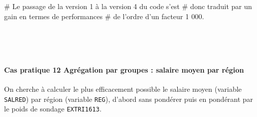 \documentclass[12pt,]{article}
\newenvironment{Shaded}{}{}
\newcommand{\CommentTok}[1]{\textcolor[rgb]{0.00,0.50,0.00}{{#1}}}
\let\oldparagraph\paragraph
\renewcommand{\paragraph}[1]{\oldparagraph{#1}\mbox{}}
\begin{document}
\begin{enumerate}
\begin{Shaded}
\begin{Highlighting}[]
\CommentTok{# Le passage de la version 1 à la version 4 du code s'est}
\CommentTok{# donc traduit par un gain en termes de performances}
\CommentTok{# de l'ordre d'un facteur 1 000.}
\end{Highlighting}
\end{Shaded}

  ~
\end{enumerate}

~

\paragraph{\texorpdfstring{\textbf{Cas pratique 12} Agrégation par
groupes : salaire moyen par
région}{Cas pratique 12 Agrégation par groupes : salaire moyen par région}}\label{cas-pratique-12-agregation-par-groupes-salaire-moyen-par-region}

On cherche à calculer le plus efficacement possible le salaire moyen
(variable \texttt{SALRED}) par région (variable \texttt{REG}), d'abord
sans pondérer puis en pondérant par le poids de sondage
\texttt{EXTRI1613}.
\end{document}
